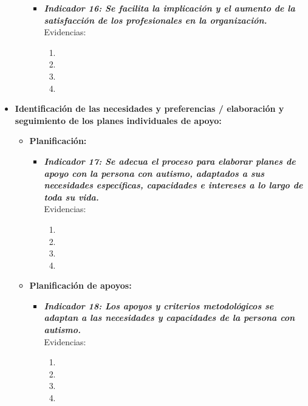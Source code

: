 \begin{itemize}
\begin{itemize}
\begin{itemize}
			

			\item \textbf{\textit{Indicador 16: Se facilita la implicación y el aumento de la satisfacción de los profesionales en la organización.}}\\Evidencias:
			
			\begin{enumerate}
				\item 
				\item 
				\item 
				\item 
			\end{enumerate}
		\end{itemize}
	\end{itemize}
	\item \textbf{Identificación de las necesidades y preferencias / elaboración y seguimiento de los planes individuales de apoyo:}
	\begin{itemize}
		\item \textbf{Planificación:}
		\begin{itemize}
			\item \textbf{\textit{Indicador 17: Se adecua el proceso para elaborar planes de apoyo con la persona con autismo, adaptados a sus necesidades específicas, capacidades e intereses a lo largo de toda su vida.}}\\Evidencias:
			
			\begin{enumerate}
				\item 
				\item 
				\item 
				\item 
			\end{enumerate}
			
		\end{itemize}
		\item \textbf{Planificación de apoyos: }
		\begin{itemize}
			\item \textbf{\textit{Indicador 18: Los apoyos y criterios metodológicos se adaptan a las necesidades y capacidades de la persona con autismo.}}\\Evidencias:
			
			\begin{enumerate}
				\item 
				\item 
				\item 
				\item 
			\end{enumerate}


\end{itemize}
\end{itemize}
\end{itemize}
